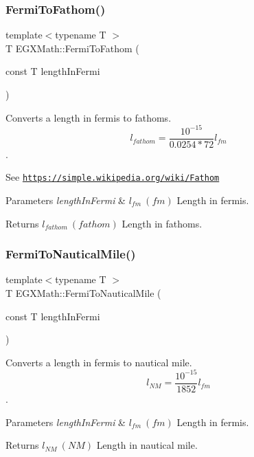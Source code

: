 \subsubsection{\texorpdfstring{Fermi\+To\+Fathom()}{FermiToFathom()}}
{\footnotesize\ttfamily template$<$typename T $>$ \\
T E\+G\+X\+Math\+::\+Fermi\+To\+Fathom (\begin{DoxyParamCaption}\item[{const T}]{length\+In\+Fermi }\end{DoxyParamCaption})}



Converts a length in fermis to fathoms. \[ l_{fathom}= \frac{10^{-15}}{0.0254 * 72} l_{fm} \]. 

See \href{https://simple.wikipedia.org/wiki/Fathom}{\tt https\+://simple.\+wikipedia.\+org/wiki/\+Fathom} 
\begin{DoxyParams}{Parameters}
{\em length\+In\+Fermi} & $ l_{fm}\ (fm)$ Length in fermis. \\
\hline
\end{DoxyParams}
\begin{DoxyReturn}{Returns}
$ l_{fathom}\ (fathom)$ Length in fathoms. 
\end{DoxyReturn}
\mbox{\label{group___e_g_x_math-_conversions-_length_conversions-_non-_s_i-_fermi-_nautical_gac5966592cf227d0a5aa87ead6a4ca7d8}} 
\subsubsection{\texorpdfstring{Fermi\+To\+Nautical\+Mile()}{FermiToNauticalMile()}}
{\footnotesize\ttfamily template$<$typename T $>$ \\
T E\+G\+X\+Math\+::\+Fermi\+To\+Nautical\+Mile (\begin{DoxyParamCaption}\item[{const T}]{length\+In\+Fermi }\end{DoxyParamCaption})}



Converts a length in fermis to nautical mile. \[ l_{NM}= \frac{10^{-15}}{1852} l_{fm} \]. 


\begin{DoxyParams}{Parameters}
{\em length\+In\+Fermi} & $ l_{fm}\ (fm)$ Length in fermis. \\
\hline
\end{DoxyParams}
\begin{DoxyReturn}{Returns}
$ l_{NM}\ (NM)$ Length in nautical mile. 
\end{DoxyReturn}
